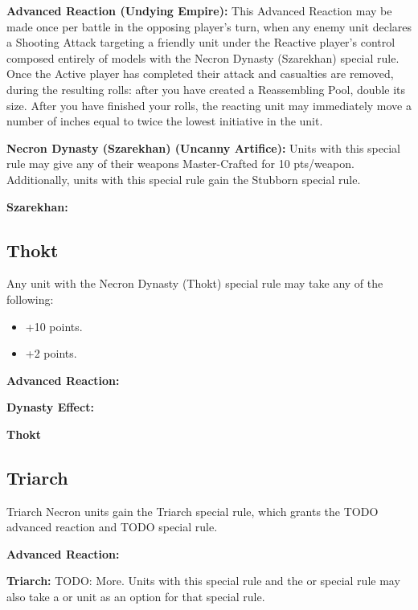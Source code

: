 \begin{multicols}{2}
\textbf{Advanced Reaction (Undying Empire):} This Advanced Reaction may be made once per battle in the opposing player's turn, when any enemy unit declares a Shooting Attack targeting a friendly unit under the Reactive player's control composed entirely of models with the Necron Dynasty (Szarekhan) special rule. Once the Active player has completed their attack and casualties are removed, during the resulting  rolls: after you have created a Reassembling Pool, double its size. After you have finished your  rolls, the reacting unit may immediately move a number of inches equal to twice the lowest initiative in the unit.

\textbf{Necron Dynasty (Szarekhan) (Uncanny Artifice):} Units with this special rule may give any of their weapons Master-Crafted for 10 pts/weapon. Additionally, units with this special rule gain the Stubborn special rule.

\textbf{Szarekhan:}


\newpage
\subsection{Thokt}

Any unit with the Necron Dynasty (Thokt) special rule may take any of the following:
\begin{itemize}
	\item {} \dotfill +10 points.
	\item {} \dotfill +2 points.
\end{itemize}

\textbf{Advanced Reaction:}

\textbf{Dynasty Effect:} 

\textbf{Thokt}


\newpage
\subsection{Triarch}

Triarch Necron units gain the Triarch special rule, which grants the TODO advanced reaction and TODO special rule.

\textbf{Advanced Reaction:}

\textbf{Triarch:} TODO: More. Units with this special rule and the  or  special rule may also take a  or  unit as an option for that special rule.


\end{multicols}

